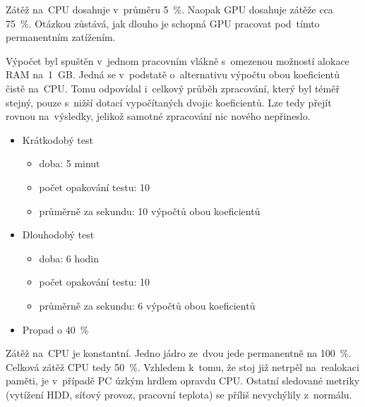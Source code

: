 Zátěž na~CPU dosahuje v~průměru 5~\%. Naopak GPU dosahuje zátěže cca 75~\%. Otázkou zůstává, jak dlouho je schopná GPU pracovat pod~tímto permanentním zatížením.

Výpočet byl spuštěn v~jednom pracovním vlákně s~omezenou možností alokace RAM na~1~GB. Jedná se v~podstatě o~alternativu výpočtu obou koeficientů čistě na~CPU. Tomu odpovídal i~celkový průběh zpracování, který byl téměř stejný, pouze s~nižší dotací vypočítaných dvojic koeficientů.
Lze tedy přejít rovnou na~výsledky, jelikož samotné zpracování nic nového nepřineslo.

\begin{itemize}
	\setlength{\parskip}{0pt}
	\setlength{\itemsep}{0pt}
	\item {Krátkodobý test}
	\begin{itemize}
		\setlength{\parskip}{0pt}
		\setlength{\itemsep}{0pt}
		\item {doba: 5 minut}
		\item {počet opakování testu: 10}
		\item {průměrně za sekundu: 10 výpočtů obou koeficientů}
	\end{itemize}
	\item {Dlouhodobý test}
	\begin{itemize}
		\setlength{\parskip}{0pt}
		\setlength{\itemsep}{0pt}
		\item {doba: 6 hodin}
		\item {počet opakování testu: 10}
		\item {průměrně za sekundu: 6 výpočtů obou koeficientů}
	\end{itemize}
	\item {Propad o 40~\%}
\end{itemize}

Zátěž na~CPU je konstantní. Jedno jádro ze~dvou jede permanentně na 100~\%. Celková zátěž CPU tedy 50~\%. Vzhledem k~tomu, že stoj již netrpěl na~realokaci paměti, je v~případě PC úzkým hrdlem opravdu CPU. Ostatní sledované metriky (vytížení HDD, síťový provoz, pracovní teplota) se příliš nevychýlily z~normálu.









